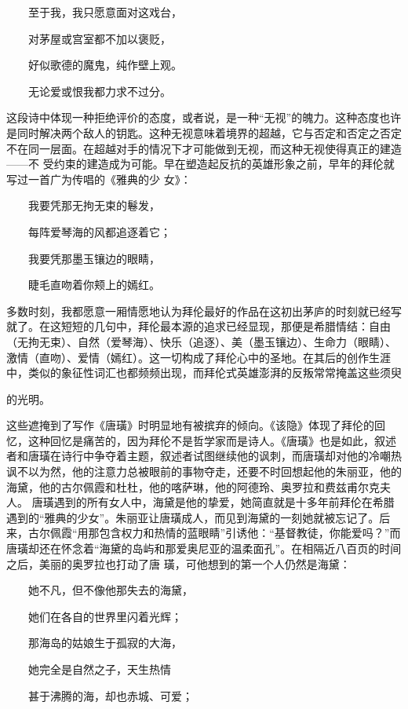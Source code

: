 \documentclass{article}
\begin{document}
　　至于我，我只愿意面对这戏台， 


　　对茅屋或宫室都不加以褒贬， 


　　好似歌德的魔鬼，纯作壁上观。 


　　无论爱或恨我都力求不过分。 

这段诗中体现一种拒绝评价的态度，或者说，是一种“无视”的魄力。这种态度也许是同时解决两个敌人的钥匙。这种无视意味着境界的超越，它与否定和否定之否定不在同一层面。在超越对手的情况下才可能做到无视，而这种无视使得真正的建造——不
\newpage
受约束的建造成为可能。早在塑造起反抗的英雄形象之前，早年的拜伦就写过一首广为传唱的《雅典的少
女》： 


　　我要凭那无拘无束的鬈发， 


　　每阵爱琴海的风都追逐着它； 


　　我要凭那墨玉镶边的眼睛， 


　　睫毛直吻着你颊上的嫣红。 

多数时刻，我都愿意一厢情愿地认为拜伦最好的作品在这初出茅庐的时刻就已经写就了。在这短短的几句中，拜伦最本源的追求已经显现，那便是希腊情结：自由（无拘无束）、自然（爱琴海）、快乐（追逐）、美（墨玉镶边）、生命力（眼睛）、激情（直吻）、爱情（嫣红）。这一切构成了拜伦心中的圣地。在其后的创作生涯中，类似的象征性词汇也都频频出现，而拜伦式英雄澎湃的反叛常常掩盖这些须臾

\newpage
的光明。 

这些遮掩到了写作《唐璜》时明显地有被摈弃的倾向。《该隐》体现了拜伦的回忆，这种回忆是痛苦的，因为拜伦不是哲学家而是诗人。《唐璜》也是如此，叙述者和唐璜在诗行中争夺着主题，叙述者试图继续他的讽刺，而唐璜却对他的冷嘲热讽不以为然，他的注意力总被眼前的事物夺走，还要不时回想起他的朱丽亚，他的海黛，他的古尔佩霞和杜杜，他的喀萨琳，他的阿德玲、奥罗拉和费兹甫尔克夫人。
唐璜遇到的所有女人中，海黛是他的挚爱，她简直就是十多年前拜伦在希腊遇到的“雅典的少女”。朱丽亚让唐璜成人，而见到海黛的一刻她就被忘记了。后来，古尔佩霞“用那包含权力和热情的蓝眼睛”引诱他：“基督教徒，你能爱吗？”而唐璜却还在怀念着“海黛的岛屿和那爱奥尼亚的温柔面孔”。在相隔近八百页的时间之后，美丽的奥罗拉也打动了唐
璜，可他想到的第一个人仍然是海黛： 


　　她不凡，但不像他那失去的海黛， 


\newpage

　　她们在各自的世界里闪着光辉； 


　　那海岛的姑娘生于孤寂的大海， 


　　她完全是自然之子，天生热情 


　　甚于沸腾的海，却也赤城、可爱； 
\end{document}
